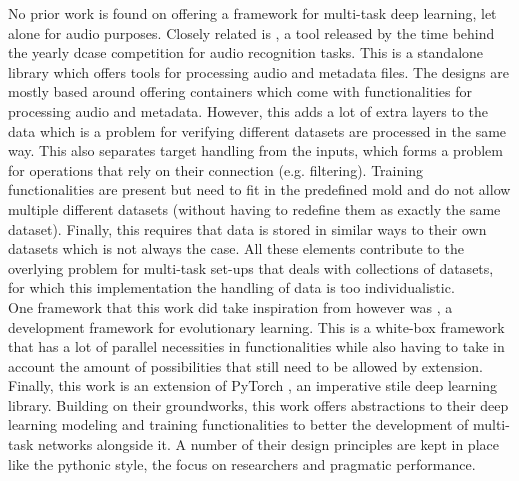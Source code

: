 No prior work is found on offering a framework for multi-task deep learning, let alone for audio purposes. Closely related is \cite{dcase-repo_2021}, a tool released by the time behind the yearly dcase \cite{dcase} competition for audio recognition tasks. This is a standalone library which offers tools for processing audio and metadata files. The designs are mostly based around offering containers which come with functionalities for processing audio and metadata. However, this adds a lot of extra layers to the data which is a problem for verifying different datasets are processed in the same way. This also separates target handling from the inputs, which forms a problem for operations that rely on their connection (e.g. filtering). Training functionalities are present but need to fit in the predefined mold and do not allow multiple different datasets (without having to redefine them as exactly the same dataset). Finally, this requires that data is stored in similar ways to their own datasets which is not always the case. All these elements contribute to the overlying problem for multi-task set-ups that deals with collections of datasets, for which this implementation the handling of data is too individualistic. \\

One framework that this work did take inspiration from however was \cite{de2012deap}, a development framework for evolutionary learning. This is a white-box framework that has a lot of parallel necessities in functionalities while also having to take in account the amount of possibilities that still need to be allowed by extension.\\

Finally, this work is an extension of PyTorch \citep{paszke2019pytorch}, an imperative stile deep learning library. Building on their groundworks, this work offers abstractions to their deep learning modeling and training functionalities to better the development of multi-task networks alongside it. A number of their design principles are kept in place like the pythonic style, the focus on researchers and pragmatic performance.\\


